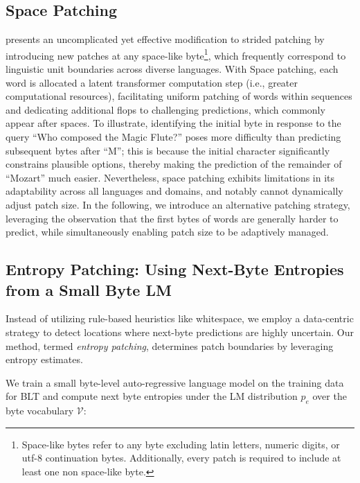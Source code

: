 \subsection{Space Patching}
\label{section:white-patch}

\citet{slagle2024spacebyte} presents an uncomplicated yet effective modification to strided patching by introducing new patches at any space-like byte\footnote{
    Space-like bytes refer to any byte excluding latin letters, numeric digits, or utf-8 continuation bytes. Additionally, every patch is required to include at least one non space-like byte. }, which frequently correspond to linguistic unit boundaries across diverse languages. With Space patching, each word is allocated a latent transformer computation step (i.e., greater computational resources), facilitating uniform patching of words within sequences and dedicating additional flops to challenging predictions, which commonly appear after spaces. To illustrate, identifying the initial byte in response to the query ``Who composed the Magic Flute?\uline{\hspace{.6em}}'' poses more difficulty than predicting subsequent bytes after ``M''; this is because the initial character significantly constrains plausible options, thereby making the prediction of the remainder of ``Mozart'' much easier. Nevertheless, space patching exhibits limitations in its adaptability across all languages and domains, and notably cannot dynamically adjust patch size. In the following, we introduce an alternative patching strategy, leveraging the observation that the first bytes of words are generally harder to predict, while simultaneously enabling patch size to be adaptively managed.

\subsection{Entropy Patching: Using Next-Byte Entropies from a Small Byte LM}
\label{section:dyn-patch}

Instead of utilizing rule-based heuristics like whitespace, we employ a data-centric strategy to detect locations where next-byte predictions are highly uncertain. Our method, termed \textit{entropy patching}, determines patch boundaries by leveraging entropy estimates.

We train a small byte-level auto-regressive language model on the training data for {\textsc BLT} and compute next byte entropies under the LM distribution $p_{e}$ over the byte vocabulary $\mathcal{V}$:

